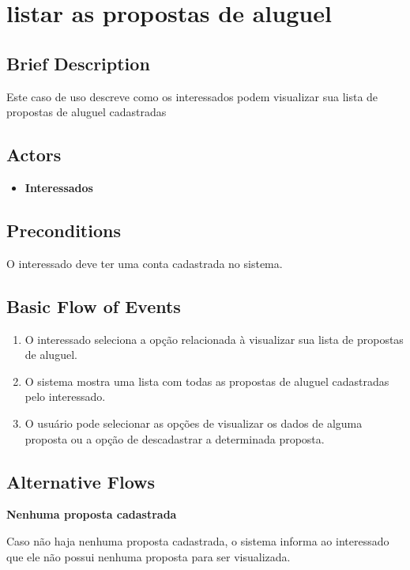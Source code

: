 \section{listar as propostas de aluguel}

\subsection*{Brief Description}
Este caso de uso descreve como os interessados podem visualizar sua lista de
propostas de aluguel cadastradas

\subsection*{Actors}

\begin{itemize}
    \item \textbf{Interessados}
\end{itemize}

\subsection*{Preconditions}
O interessado deve ter uma conta cadastrada no sistema.

\subsection*{Basic Flow of Events}

\begin{enumerate}
    \item  O interessado seleciona a opção relacionada à visualizar sua lista de propostas de aluguel.
    \item O sistema mostra uma lista com todas as propostas de aluguel cadastradas pelo
    interessado.
    \item O usuário pode selecionar as opções de visualizar os dados de alguma proposta ou a
    opção de descadastrar a determinada proposta.
\end{enumerate}

\subsection*{Alternative Flows}

\textbf{Nenhuma proposta cadastrada}


Caso não haja nenhuma proposta cadastrada, o sistema informa ao interessado que ele não
possui nenhuma proposta para ser visualizada.

